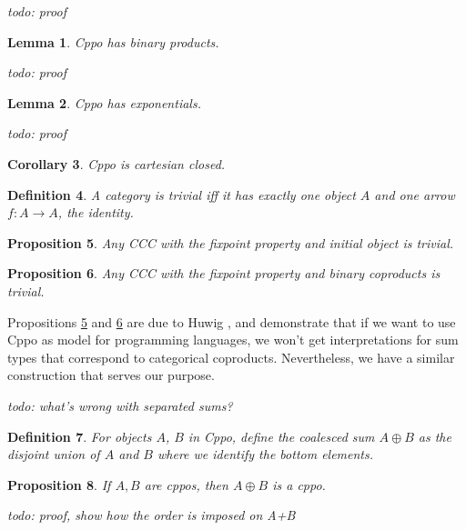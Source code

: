 \documentclass[a4paper]{article}
\newcommand{\arr}{\rightarrow}
\newcommand{\todo}[1]{\smallskip \noindent \emph{todo: #1} \smallskip}
\newtheorem{definition}{Definition}[section]
\newtheorem{proposition}[definition]{Proposition}
\newtheorem{lemma}[definition]{Lemma}
\newtheorem{corollary}[definition]{Corollary}
\begin{document}
\todo{proof}

\begin{lemma} \label{lemCppoBinaryProducts}
Cppo has binary products.
\end{lemma}

\todo{proof}

\begin{lemma} \label{lemCppoExponentials}
Cppo has exponentials.
\end{lemma}

\todo{proof}

\begin{corollary}
Cppo is cartesian closed.
\end{corollary}


\begin{definition}
A category is \emph{trivial} iff it has exactly one object $A$ and one arrow
$f : A \arr A$, the identity.
\end{definition}

\begin{proposition} \label{propCCCNoFixpointInitialObject}
Any CCC with the fixpoint property and initial object is trivial.
\end{proposition}

\begin{proposition} \label{propCCCNoFixpointCoproducts}
Any CCC with the fixpoint property and binary coproducts is trivial.
\end{proposition}

Propositions \ref{propCCCNoFixpointInitialObject} and
\ref{propCCCNoFixpointCoproducts} are due to Huwig \cite{Huwig1990}, and
demonstrate that if we want to use Cppo as model for programming languages, we
won't get interpretations for sum types that correspond to categorical
coproducts. Nevertheless, we have a similar construction that serves our
purpose.

\todo{what's wrong with separated sums?}

\begin{definition} \label{defCoalescedSum}
For objects $A$, $B$ in Cppo, define the \emph{coalesced sum} $A \oplus B$ as
the disjoint union of $A$ and $B$ where we identify the bottom elements.
\end{definition}

\begin{proposition}
If $A, B$ are cppos, then $A \oplus B$ is a cppo.
\end{proposition}

\todo{proof, show how the order is imposed on A+B}
\end{document}
